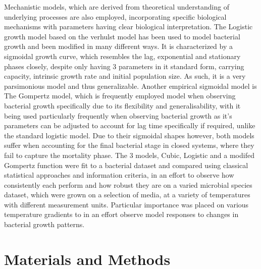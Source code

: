 \documentclass[11pt]{article}
\begin{document}
Mechanistic models, which are derived from theoretical understanding of underlying processes are also employed, incorporating specific biological mechanisms with parameters having clear biological interpretation. The Logistic growth model based on the verhulst model has been used to model bacterial growth and been modified in many different ways\cite{Peleg01122011}. It is characterized by a sigmoidal growth curve, which resembles the lag, exponential and stationary phases closely, despite only having 3 parameters in it standard form, carrying capacity, intrinsic growth rate and initial population size. As such, it is a very parsimonious model and thus generalizable. Another empirical sigmoidal model is The Gompertz model, which is frequently employed model when observing bacterial growth specifically due to its flexibility and generalisability, with it being used particularly frequently when observing bacterial growth as it's parameters can be adjusted to account for lag time specifically if required, unlike the standard logistic model. Due to their sigmoidal shapes however, both models suffer when accounting for the final bacterial stage in closed systems, where they fail to capture the mortality phase\cite{buchanan1997simple, Peleg01122011}.                
The 3 models, Cubic, Logistic and a modifed Gompertz function were fit to a bacterial dataset and compared using classical statistical approaches and information criteria, in an effort to observe how consistently each perform and how robust they are on a varied microbial species dataset, which were grown on a selection of media, at a variety of temperatures with different measurement units. Particular importance was placed on various temperature gradients to in an effort observe model responses to changes in bacterial growth patterns.    

\setlength{\parskip}{1.2em} %


\section{Materials and Methods}
\end{document}
